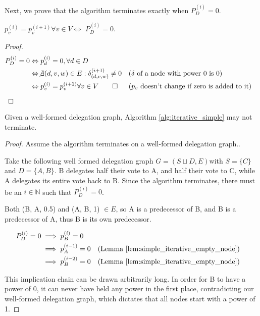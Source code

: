 Next, we prove that the algorithm terminates exactly when $P_D^{(i)} = 0$.

\begin{lemma}\label{lem:simple_alg_terminates}
 $p_v^{(i)} = p_v^{(i+1)} \forall v \in V \Leftrightarrow$ $P_D^{(i)} = 0$.
\end{lemma}
\begin{proof}

\begin{align*}
	P_D^{(i)} = 0 
	&\Leftrightarrow p_d^{(i)} = 0, \forall d \in D \\
	&\Leftrightarrow \not\exists (d, v, w) \in E: \delta_{(d, v, w)}^{(i+1)} \neq 0  &&\text{($\delta$ of a node with power 0 is 0)}\\
	&\Leftrightarrow p_v^{(i)} = p_v^{(i+1)} \forall v \in V \qed  &&\text{($p_v$ doesn't change if zero is added to it)}
\end{align*}
\end{proof}

\begin{theorem}\label{alg:iterative_alg_doesnt_terminate}
Given a well-formed delegation graph, Algorithm \ref{alg:iterative_simple} may not terminate.
\end{theorem}
\begin{proof} Assume the algorithm terminates on a well-formed delegation graph..

Take the following well formed delegation graph $G = (S\sqcup D, E)$with $S =\{C\}$ and $D = \{A, B\}$. B delegates half their vote to A, and half their vote to C, while A delegates its entire vote back to B. Since the algorithm terminates, there must be an $i \in \mathbb{N}$ such that $P_D^{(i)} = 0$. 


Both (B, A, 0.5) and (A, B, 1) $\in E$, so A is a predecessor of B, and B is a predecessor of A, thus B is its own predecessor.

\begin{align*}
	P_D^{(i)} = 0 
	&\implies p_B^{(i)} = 0 \\
	&\implies p_A^{(i-1)} = 0 &&\text{(Lemma \ref{lem:simple_iterative_empty_node})} \\
	&\implies p_B^{(i-2)} = 0 &&\text{(Lemma \ref{lem:simple_iterative_empty_node})}
\end{align*}

This implication chain can be drawn arbitrarily long. In order for B to have a power of 0, it can never have held any power in the first place, contradicting our well-formed delegation graph, which dictates that all nodes start with a power of 1.

\end{proof}

